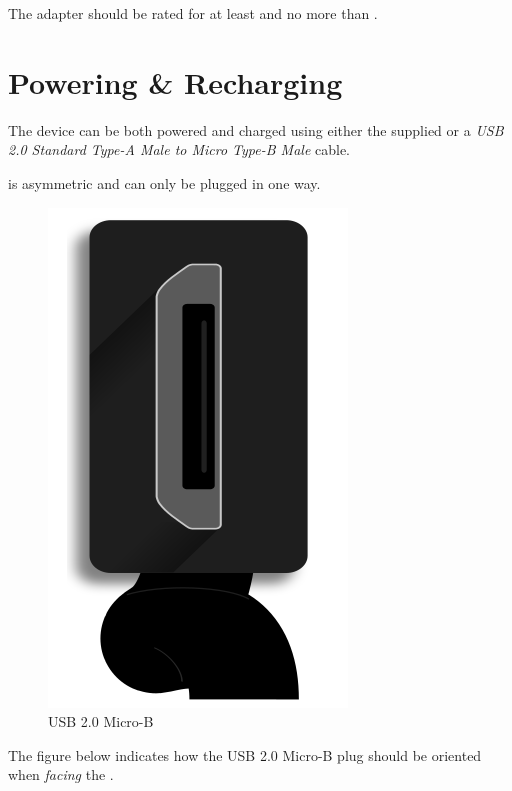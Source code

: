 The adapter should be rated for at least  and no more than
.

\chapter{Powering \& Recharging} \label{Powering and Recharging}

The device can be both powered and charged using either the supplied
\hyperref[Power Adapter]{} or a \textit{USB 2.0 Standard Type-A Male to
Micro Type-B Male} cable.

\par\medskip

 is asymmetric and can only be plugged in one way.

\begin{figure}[H]
\centering
  \includegraphics{images/usb.png}
\caption{USB 2.0 Micro-B}
\end{figure}

The figure below indicates how the USB 2.0 Micro-B plug should be oriented when
\textit{facing} the \hyperref[Power Port]{}.

